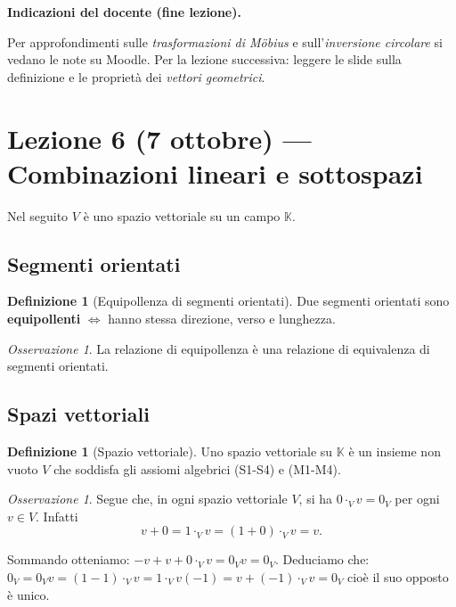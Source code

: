 \documentclass[11pt,a4paper]{article}
\newcommand{\KK}{\mathbb{K}}
\theoremstyle{plain}
\theoremstyle{definition}
\newtheorem{defn}[prop]{Definizione}
\theoremstyle{remark}
\newtheorem{oss}[prop]{Osservazione}
\begin{document}
\par\medskip
\noindent\textbf{Indicazioni del docente (fine lezione).}\par

Per approfondimenti sulle \emph{trasformazioni di Möbius} e sull'\emph{inversione circolare} si vedano le note su Moodle.
Per la lezione successiva: leggere le slide sulla definizione e le proprietà dei \emph{vettori geometrici}.
\par\medskip

\section{Lezione 6 (7 ottobre) --- Combinazioni lineari e sottospazi}

Nel seguito $V$ è uno spazio vettoriale su un campo $\KK$.

\subsection{Segmenti orientati}

\begin{defn}[Equipollenza di segmenti orientati]
Due segmenti orientati sono \textbf{equipollenti} $\iff$ hanno stessa direzione, verso e lunghezza.
\end{defn}
\begin{oss}
La relazione di equipollenza è una relazione di equivalenza di segmenti orientati.
\end{oss}

\subsection{Spazi vettoriali}

\begin{defn}[Spazio vettoriale]
Uno spazio vettoriale su $\KK$ è un insieme non vuoto $V$ che soddisfa gli assiomi algebrici (S1-S4) e (M1-M4).
\end{defn}
\begin{oss}
Segue che, in ogni spazio vettoriale $V$, si ha $0\cdot_Vv=0_V$ per ogni $v\in V$. Infatti
\[
    v+0=1\cdot_Vv = (1+0)\cdot _Vv=v.
\]
\end{oss}
Sommando otteniamo: $-v+v +0\cdot_Vv =0_Vv=0_V$.
Deduciamo che: $0_V= 0_Vv=(1-1)\cdot_Vv = 1\cdot_Vv(-1)=v+(-1)\cdot_Vv=0_V$ cioè il suo opposto è unico.
\end{document}
